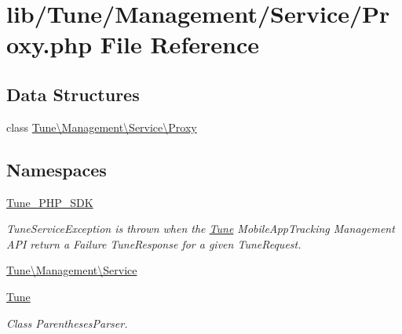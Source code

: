 \hypertarget{Proxy_8php}{\section{lib/\-Tune/\-Management/\-Service/\-Proxy.php File Reference}
\label{Proxy_8php}
}
\subsection*{Data Structures}
\begin{DoxyCompactItemize}
\item 
class \hyperlink{classTune_1_1Management_1_1Service_1_1Proxy}{Tune\textbackslash{}\-Management\textbackslash{}\-Service\textbackslash{}\-Proxy}
\end{DoxyCompactItemize}
\subsection*{Namespaces}
\begin{DoxyCompactItemize}
\item 
\hyperlink{namespaceTune__PHP__SDK}{Tune\-\_\-\-P\-H\-P\-\_\-\-S\-D\-K}
\begin{DoxyCompactList}\small\item\em Tune\-Service\-Exception is thrown when the \hyperlink{namespaceTune}{Tune} Mobile\-App\-Tracking Management A\-P\-I return a Failure Tune\-Response for a given Tune\-Request. \end{DoxyCompactList}\item 
\hyperlink{namespaceTune_1_1Management_1_1Service}{Tune\textbackslash{}\-Management\textbackslash{}\-Service}
\item 
\hyperlink{namespaceTune}{Tune}
\begin{DoxyCompactList}\small\item\em Class Parentheses\-Parser. \end{DoxyCompactList}\end{DoxyCompactItemize}
